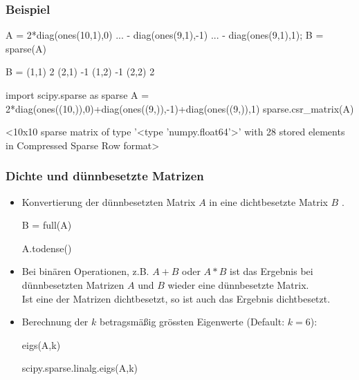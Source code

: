 \documentclass[hyperref={xetex}]{beamer}
\begin{document}
\begin{frame}[fragile]\frametitle{Beispiel}
\begin{matlabin}
A = 2*diag(ones(10,1),0) ...
       - diag(ones(9,1),-1) ...
       - diag(ones(9,1),1);
B = sparse(A)
\end{matlabin}
\begin{matlab}
B =   (1,1)        2
      (2,1)       -1
      (1,2)       -1
      (2,2)        2
\end{matlab}
\begin{pyin}
import scipy.sparse as sparse
A = 2*diag(ones((10,)),0)+diag(ones((9,)),-1)+diag(ones((9,)),1)
sparse.csr_matrix(A)
\end{pyin}
\begin{pyout}
<10x10 sparse matrix of type '<type 'numpy.float64'>'
  with 28 stored elements in Compressed Sparse Row format>
\end{pyout}
\end{frame}
% 
%
\begin{frame}[fragile]\frametitle{Dichte und d\"unnbesetzte Matrizen}
\begin{itemize}
\item Konvertierung der d\"unnbesetzten Matrix $A$ in eine dichtbesetzte Matrix $B$ .
\begin{matlabin}
B = full(A)
\end{matlabin}
\begin{pyin}
A.todense()  
\end{pyin}
\item Bei bin\"aren Operationen, z.B. $A+B$ oder $A*B$ ist das Ergebnis
  bei d\"unnbesetzten Matrizen $A$ und $B$ wieder eine d\"unnbesetzte
  Matrix. \\Ist eine der Matrizen dichtbesetzt, so ist auch das Ergebnis
  dichtbesetzt. 
\item Berechnung der $k$ betragsm\"a{\ss}ig  gr\"ossten Eigenwerte (Default: $k=6$):
\begin{matlabin}
eigs(A,k) 
\end{matlabin}
\begin{pyin}
scipy.sparse.linalg.eigs(A,k)
\end{pyin}
\end{itemize}
\end{frame}
% 
%
\end{document}
